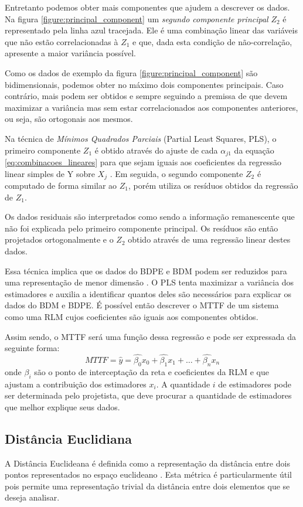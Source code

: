 Entretanto podemos obter mais componentes que ajudem a descrever os dados. Na figura \ref{figure:principal_component} um \textit{segundo componente principal} $Z_2$ é representado pela linha azul tracejada. Ele é uma combinação linear das variáveis que não estão correlacionadas à $Z_1$ e que, dada esta condição de não-correlação, apresente a maior variância possível.

Como os dados de exemplo da figura \ref{figure:principal_component} são bidimensionais, podemos obter no máximo dois componentes principais. Caso contrário, mais podem ser obtidos e sempre seguindo a premissa de que devem maximizar a variância mas sem estar correlacionados aos componentes anteriores, ou seja, são ortogonais aos mesmos.

Na técnica de \textit{Mínimos Quadrados Parciais} (Partial Least Squares, PLS), o primeiro componente $Z_1$ é obtido através do ajuste de cada $\alpha_{j1}$ da equação \ref{eq:combinacoes_lineares} para que sejam iguais aos coeficientes da regressão linear simples de Y sobre $X_j$ \cite{James2013}. Em seguida, o segundo componente $Z_2$ é computado de forma similar ao $Z_1$, porém utiliza os resíduos obtidos da regressão de $Z_1$.

Os dados residuais são interpretados como sendo a informação remanescente que não foi explicada pelo primeiro componente principal. Os resíduos são então projetados ortogonalmente e o $Z_2$ obtido através de uma regressão linear destes dados.

Essa técnica implica que os dados do BDPE e BDM podem ser reduzidos para uma representação de menor dimensão \cite{Maitra2008}. O PLS tenta maximizar a variância dos estimadores e auxilia a identificar quantos deles são necessários para explicar os dados do BDM e BDPE. É possível então descrever o MTTF de um sistema como uma RLM cujos coeficientes são iguais aos componentes obtidos.

Assim sendo, o MTTF será uma função dessa regressão e pode ser expressada da seguinte forma:
\begin{equation}
MTTF = \hat{y}= \hat{\beta_0}x_0+\hat{\beta_1}x_1+\dots+\hat{\beta_n}x_n
\label{eq:MTTF_estimadores}
\end{equation}
onde $\beta_i$ são o ponto de interceptação da reta e coeficientes da RLM e que ajustam a contribuição dos estimadores $x_i$. A quantidade $i$ de estimadores pode ser determinada pelo projetista, que deve procurar a quantidade de estimadores que melhor explique seus dados. 

\subsection{Distância Euclidiana}
\label{subsection_estimativas_euclidiana}
A Distância Euclideana é definida como a representação da distância entre dois pontos representados no espaço euclideano \cite{Deza2009}. Esta métrica é particularmente útil pois permite uma representação trivial da distância entre dois elementos que se deseja analisar.

